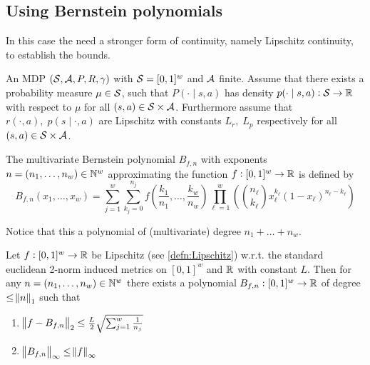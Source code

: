 \subsection{Using Bernstein polynomials}

In this case the need a stronger form of continuity, namely
Lipschitz continuity, to establish the bounds.

\begin{sett}
  An MDP $(\mathcal{S}, \mathcal{A}, P, R, \gamma)$ with
  $\mathcal{S} = [0,1]^w$ and $\mathcal{A}$ finite.
  Assume that there exists a probability measure $\mu \in \mathcal{S}$, such that
  $P(\cdot \mid s, a)$ has density
  $p(\cdot \mid s, a) : \mathcal{S} \to \mathbb{R}$ with respect to
  $\mu$ for all $(s, a) \in \mathcal{S}\times\mathcal{A}$. 
  Furthermore assume that $r(\cdot, a), \; p(s \mid \cdot, a)$ are
  Lipschitz
  with constants $L_r,\; L_p$ respectively for all
  $(s, a) \in \mathcal{S} \times \mathcal{A}$.
  \label{sett:polyApprox}
\end{sett}

\begin{defn}
  The multivariate Bernstein polynomial $B_{f, n}$ with exponents
  $n=(n_1, \dots, n_w) \in \mathbb{N}^w$ approximating the function $f:[0,1]^w \to \mathbb{R}$
  is defined by
  \begin{equation*}
    B_{f, n}(x_1, \dots, x_w) =
    \sum_{j = 1}^w \sum_{k_j = 0}^{n_j}
    f\left( \frac{k_1}{n_1}, \dots, \frac{k_w}{n_w} \right)
    \prod_{\ell = 1}^w \left(
    \binom{n_\ell}{k_\ell} x_\ell^{k_\ell}(1-x_\ell)^{n_\ell - k_\ell} \right)
  \end{equation*}
  \label{defn:Bfn}
\end{defn}
Notice that this a polynomial of (multivariate) degree $n_1 + \dots + n_w$.

\begin{thm}
  Let $f : [0,1]^w \to \mathbb{R}$ be Lipschitz (see \cref{defn:Lipschitz})
  w.r.t. the standard euclidean 2-norm induced metrics on $[0,1]^w$ and $\mathbb{R}$
  with constant $L$. 
  Then for any $n = (n_1, \dots, n_w) \in \mathbb{N}^w$ there exists a polynomial
  $B_{f,n} : [0,1]^w \to \mathbb{R}$ of degree $\leq \norm{n}_1$ such that
  \begin{enumerate}
    \item $\norm{f - B_{f,n}}_2
      \leq \frac{L}{2} \sqrt{\sum_{j=1}^w \frac{1}{n_j}}$
    \item $\norm{B_{f,n}}_\infty \leq \norm{f}_\infty$
  \end{enumerate}
\end{thm}

